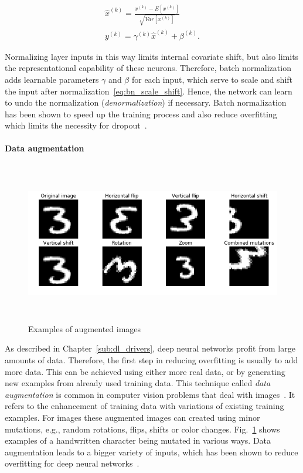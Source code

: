 \begin{align}
  \widehat{x}^{(k)} = \frac{x^{(k)} - E[x^{(k)}]}{\sqrt{Var[x^{(k)}]}} \label{eq:bn_norm} \\
  y^{(k)} = \gamma^{(k)} \widehat{x}^{(k)} + \beta^{(k)} \label{eq:bn_scale_shift}.
\end{align}

Normalizing layer inputs in this way limits internal covariate shift, but also
limits the representational capability of these neurons.
Therefore, batch normalization adds learnable parameters $\gamma$ and $\beta$ for
each input, which serve to scale and shift the input after normalization~\ref{eq:bn_scale_shift}.
Hence, the network can learn to undo the normalization (\textit{denormalization})
if necessary.
Batch normalization has been shown to speed up the training process and also
reduce overfitting which limits the necessity for dropout~\cite{Ioffe2015}.

\paragraph{Data augmentation}

\begin{figure}[h]
  \centering
  \includegraphics[height=7cm]{img/data_augmentation}
  \caption{Examples of augmented images}
\label{fig:augmented_images}
\end{figure}

As described in Chapter~\ref{sub:dl_drivers}, deep neural networks profit from
large amounts of data.
Therefore, the first step in reducing overfitting is usually to add
more data.
This can be achieved using either more real data, or by generating new examples
from already used training data.
This technique called \textit{data augmentation} is common in computer vision
problems that deal with images~\cite{Simard2003}.
It refers to the enhancement of training data with variations of existing training
examples.
For images these augmented images can created using minor mutations, e.g., random rotations, flips, shifts or
color changes.
Fig.~\ref{fig:augmented_images} shows examples of a handwritten character being
mutated in various ways.
Data augmentation leads to a bigger variety of inputs, which has been shown
to reduce overfitting for deep neural networks~\cite{Krizhevsky2012}.
